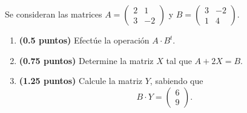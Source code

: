 
Se consideran las matrices $A=\begin{pmatrix}2&1\\3&-2\end{pmatrix}$ y $B=\begin{pmatrix}3&-2\\1&4\end{pmatrix}$.
\begin{enumerate}[label=\alph*)]
\item \textbf{(0.5 puntos)} Efectúe la operación $A\cdot B^t$.
\item \textbf{(0.75 puntos)} Determine la matriz $X$ tal que $A+2X=B$.
\item \textbf{(1.25 puntos)} Calcule la matriz $Y$, sabiendo que
\[
B\cdot Y=\begin{pmatrix}6\\9\end{pmatrix}.
\]
\end{enumerate}
